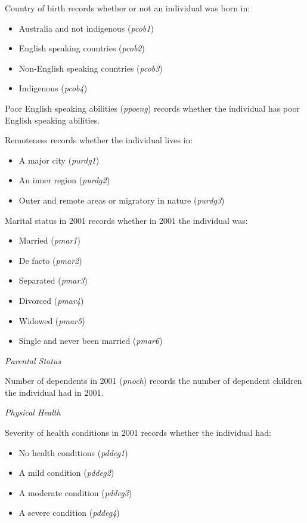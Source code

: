 \documentclass[12pt, a4paper]{article}
\begin{document}
Country of birth records whether or not an individual was born in:
\begin{itemize}
  \item Australia and not indigenous (\textit{p\textunderscore{}cob1}) 
  \item English speaking countries (\textit{p\textunderscore{}cob2})
  \item Non-English speaking countries (\textit{p\textunderscore{}cob3})
  \item Indigenous (\textit{p\textunderscore{}cob4})
\end{itemize}  
  
Poor English speaking abilities (\textit{p\textunderscore{}poeng}) records whether the individual has poor English speaking abilities. 

Remoteness records whether the individual lives in:
\begin{itemize}
  \item A major city (\textit{p\textunderscore{}urdg1})
  \item An inner region (\textit{p\textunderscore{}urdg2}) 
  \item Outer and remote areas or migratory in nature (\textit{p\textunderscore{}urdg3})
\end{itemize}  
  
Marital status in 2001 records whether in 2001 the individual was:
\begin{itemize}
  \item Married (\textit{p\textunderscore{}mar1})
  \item De facto (\textit{p\textunderscore{}mar2})
  \item Separated (\textit{p\textunderscore{}mar3})
  \item Divorced (\textit{p\textunderscore{}mar4})
  \item Widowed (\textit{p\textunderscore{}mar5})
  \item Single and never been married (\textit{p\textunderscore{}mar6})
\end{itemize}  
  
\emph{Parental Status}

Number of dependents in 2001 (\textit{p\textunderscore{}noch}) records the number of dependent children the individual had in 2001. 

\emph{Physical Health}

Severity of health conditions in 2001 records whether the individual had:
\begin{itemize}
  \item No health conditions (\textit{p\textunderscore{}ddeg1})
  \item A mild condition (\textit{p\textunderscore{}ddeg2})
  \item A moderate condition (\textit{p\textunderscore{}ddeg3})
  \item A severe condition (\textit{p\textunderscore{}ddeg4})
\end{itemize}  
  
\end{document}
